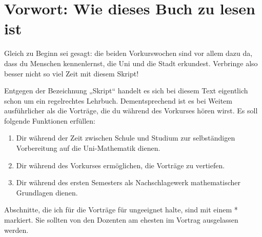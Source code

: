 

\chapter{Vorwort: Wie dieses Buch zu lesen ist}

Gleich zu Beginn sei gesagt: die beiden Vorkurswochen sind vor allem dazu da, dass du Menschen kennenlernst, die Uni und die Stadt erkundest. Verbringe also besser nicht so viel Zeit mit diesem Skript!

Entgegen der Bezeichnung „Skript“ handelt es sich bei diesem Text eigentlich schon um ein regelrechtes Lehrbuch. Dementsprechend ist es bei Weitem ausführlicher als die Vorträge, die du während des Vorkurses hören wirst. Es soll folgende Funktionen erfüllen:
\begin{enumerate}[1.]
    \item Dir während der Zeit zwischen Schule und Studium zur selbständigen Vorbereitung auf die Uni-Mathematik dienen.
    \item Dir während des Vorkurses ermöglichen, die Vorträge zu vertiefen.
    \item Dir während des ersten Semesters als Nachschlagewerk mathematischer Grundlagen dienen.
\end{enumerate}
Abschnitte, die ich für die Vorträge für ungeeignet halte, sind mit einem * markiert. Sie sollten von den Dozenten am ehesten im Vortrag ausgelassen werden.


